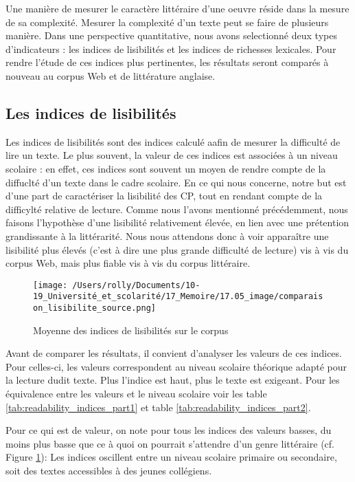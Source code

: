 \documentclass[12pt,a4paper,oneside,titlepage]{book} %
\begin{document}
	Une manière de mesurer le caractère littéraire d'une oeuvre réside dans la mesure de sa complexité. Mesurer la complexité d'un texte peut se faire de plusieurs manière. Dans une perspective quantitative, nous avons selectionné deux types d'indicateurs : les indices de lisibilités et les indices de richesses lexicales. 
	Pour rendre l'étude de ces indices plus pertinentes, les résultats seront comparés à nouveau au corpus Web et de littérature anglaise.


	\subsection{Les indices de lisibilités} 
	Les indices de lisibilités sont des indices calculé aafin de mesurer la difficulté de lire un texte. Le plus souvent, la valeur de ces indices est associées à un niveau scolaire : en effet, ces indices sont souvent un moyen de rendre compte de la diffuclté d'un texte dans le cadre scolaire. 
	En ce qui nous concerne, notre but est d'une part de caractériser la lisibilité des CP, tout en rendant compte de la difficylté relative de lecture. Comme nous l'avons mentionné précédemment, nous faisons l'hypothèse d'une lisibilité relativement élevée, en lien avec une prétention grandissante à la littérarité. Nous nous attendons donc à voir apparaître une lisibilité plus élevés (c'est à dire une plus grande difficulté de lecture) vis à vis du corpus Web, mais plus fiable vis à vis du corpus littéraire.
	
	\begin{figure}
\centering
\texttt{[image: /Users/rolly/Documents/10-19\_Université\_et\_scolarité/17\_Memoire/17.05\_image/comparaison\_lisibilite\_source.png]}
\caption{Moyenne des indices de lisibilités sur le corpus}
\label{fig:mean_readbility}
	\end{figure}
	
	Avant de comparer les résultats, il convient d'analyser les valeurs de ces indices. Pour celles-ci, les valeurs correspondent au niveau scolaire théorique adapté pour la lecture dudit texte. Plus l'indice est haut, plus le texte est exigeant. Pour les équivalence entre les valeurs et le niveau scolaire voir les table \ref{tab:readability_indices_part1} et table \ref{tab:readability_indices_part2}.
	
	Pour ce qui est de valeur, on note pour tous les indices des valeurs basses, du moins plus basse que ce à quoi on pourrait s'attendre d'un genre littéraire (cf. Figure \ref{fig:mean_readbility}): Les indices oscillent entre un niveau scolaire primaire ou secondaire, soit des textes accessibles à des jeunes collégiens. 
	
\end{document}
